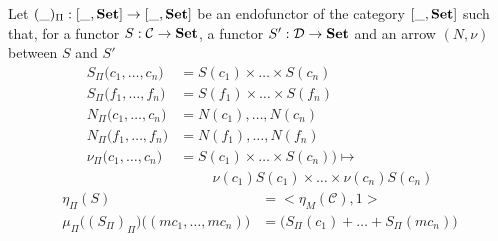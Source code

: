\documentclass{report}
\newcommand{\prodmon}{\Pi}
\begin{document}





\begin{defn}[The monad $(\_)_\prodmon$]
    Let $(\_)_\prodmon : [\_, \bf Set] \rightarrow [\_,\bf Set]$ be an endofunctor of the category $ [\_, \bf Set] $ such that, for a functor $S : \mathcal{C} \rightarrow \bf Set$, a functor $S' : \mathcal{D} \rightarrow \bf Set$ and an arrow $(N,\nu)$ between $S$ and $S'$
    \begin{align*}
        S_\prodmon\big(c_1,\dots,c_n\big)
         & = S(c_1)\times\dots\times S(c_n)           \\
        S_\prodmon\big(f_1,\dots,f_n\big)
         & = S(f_1)\times\dots\times S(f_n)           \\
        N_\prodmon\big(c_1,\dots,c_n\big)
         & = N(c_1),\dots, N(c_n)                     \\
        N_\prodmon\big(f_1,\dots,f_n\big)
         & = N(f_1),\dots, N(f_n)                     \\
        \nu_\prodmon\big(c_1,\dots,c_n\big)
         & = S(c_1)\times\dots\times S(c_n))  \mapsto \\
         & \hspace{1cm}
        \nu(c_1) S(c_1)\times\dots\times \nu(c_n) S(c_n)
    \end{align*}
    \begin{align*}
        \eta_\prodmon(S)                                                       & = \big<\eta_M(\mathcal{C}),\mathrm{1}\big>             \\
        \mu_\prodmon\big((S_\prodmon)_\prodmon\big)\big((mc_1,\dots,mc_n)\big) & =  \big(S_\prodmon(c_1)+ \dots + S_\prodmon(mc_n)\big) \\
    \end{align*}
\end{defn}
\end{document}
